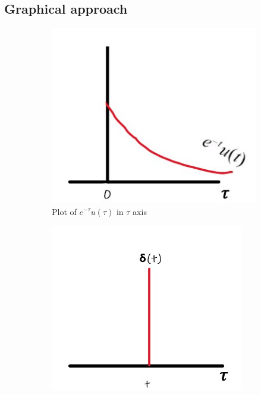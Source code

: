 \documentclass{article}[12 pt]
\begin{document}
\subsection*{Graphical approach}
\begin{figure}[H]
\begin{subfigure}{.5\textwidth}
  \centering
  \includegraphics[width=.8\linewidth, height=.8\linewidth]{1.jpg}  
  \caption{Plot of $e^{-\tau}u(\tau)$ in $\tau$ axis}
  \label{fig:sub-first}
\end{subfigure}
\begin{subfigure}{.5\textwidth}
  \centering
  \includegraphics[width=.8\linewidth, height=.8\linewidth]{2.jpg}  

\end{subfigure}
\end{figure}
\end{document}
